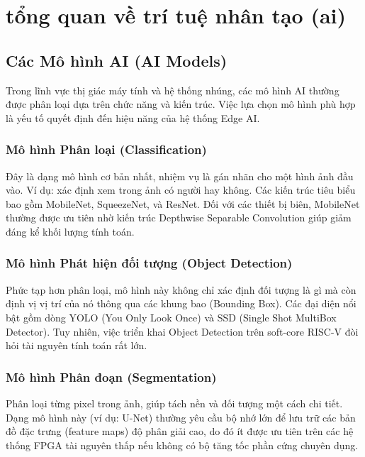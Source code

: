 \section{tổng quan về trí tuệ nhân tạo (ai)}
\label{sec:ai_overview}

\subsection{Các Mô hình AI (AI Models)}
Trong lĩnh vực thị giác máy tính và hệ thống nhúng, các mô hình AI thường được phân loại dựa trên chức năng và kiến trúc. Việc lựa chọn mô hình phù hợp là yếu tố quyết định đến hiệu năng của hệ thống Edge AI.

\subsubsection{Mô hình Phân loại (Classification)}
Đây là dạng mô hình cơ bản nhất, nhiệm vụ là gán nhãn cho một hình ảnh đầu vào. Ví dụ: xác định xem trong ảnh có người hay không. Các kiến trúc tiêu biểu bao gồm MobileNet, SqueezeNet, và ResNet. Đối với các thiết bị biên, MobileNet thường được ưu tiên nhờ kiến trúc Depthwise Separable Convolution giúp giảm đáng kể khối lượng tính toán.

\subsubsection{Mô hình Phát hiện đối tượng (Object Detection)}
Phức tạp hơn phân loại, mô hình này không chỉ xác định đối tượng là gì mà còn định vị vị trí của nó thông qua các khung bao (Bounding Box). Các đại diện nổi bật gồm dòng YOLO (You Only Look Once) và SSD (Single Shot MultiBox Detector). Tuy nhiên, việc triển khai Object Detection trên soft-core RISC-V đòi hỏi tài nguyên tính toán rất lớn.

\subsubsection{Mô hình Phân đoạn (Segmentation)}
Phân loại từng pixel trong ảnh, giúp tách nền và đối tượng một cách chi tiết. Dạng mô hình này (ví dụ: U-Net) thường yêu cầu bộ nhớ lớn để lưu trữ các bản đồ đặc trưng (feature maps) độ phân giải cao, do đó ít được ưu tiên trên các hệ thống FPGA tài nguyên thấp nếu không có bộ tăng tốc phần cứng chuyên dụng.

